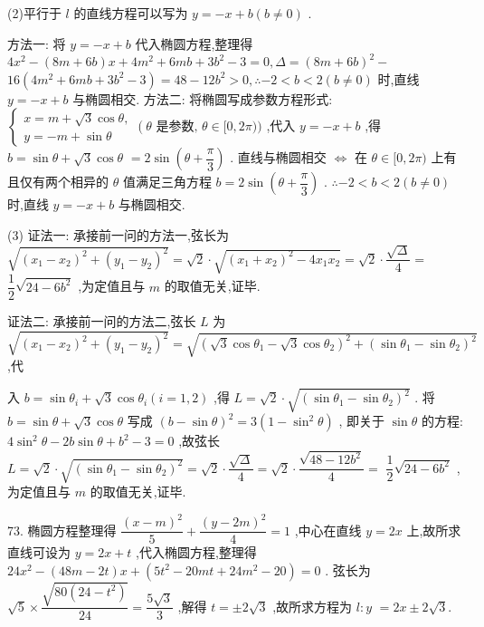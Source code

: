 (2)平行于 $l$ 的直线方程可以写为 $y =  - x + b\left( {b \neq  0}\right)$ .

方法一: 将 $y =  - x + b$ 代入椭圆方程,整理得 $4{x}^{2} - \left( {{8m} + {6b}}\right) x + 4{m}^{2} + {6mb} + 3{b}^{2} - 3 = 0,\Delta  = {\left( 8m + 6b\right) }^{2} -$  ${16}\left( {4{m}^{2} + {6mb} + 3{b}^{2} - 3}\right)  = {48} - {12}{b}^{2} > 0,\therefore  - 2 < b < 2\left( {b \neq  0}\right)$ 时,直线 $y =  - x + b$ 与椭圆相交. 方法二: 将椭圆写成参数方程形式: $\left\{  {\begin{array}{l} x = m + \sqrt{3}\cos \theta , \\  y =  - m + \sin \theta  \end{array}\left( {\theta \text{ 是参数, }\theta  \in  \lbrack 0,{2\pi }))}\right. }\right.$ ,代入 $y =  - x + b$ ,得 $b = \sin \theta  + \sqrt{3}\cos \theta$  $= 2\sin \left( {\theta  + \dfrac{\pi }{3}}\right)$ . 直线与椭圆相交 $\Leftrightarrow$ 在 $\theta  \in  \lbrack 0,{2\pi })$ 上有且仅有两个相异的 $\theta$ 值满足三角方程 $b = 2\sin \left( {\theta  + \dfrac{\pi }{3}}\right)$ . $\therefore  - 2 < b < 2\left( {b \neq  0}\right)$ 时,直线 $y =  - x + b$ 与椭圆相交.

(3) 证法一: 承接前一问的方法一,弦长为 $\sqrt{{\left( {x}_{1} - {x}_{2}\right) }^{2} + {\left( {y}_{1} - {y}_{2}\right) }^{2}} = \sqrt{2} \cdot  \sqrt{{\left( {x}_{1} + {x}_{2}\right) }^{2} - 4{x}_{1}{x}_{2}} = \sqrt{2} \cdot  \dfrac{\sqrt{\Delta }}{4} =$  $\dfrac{1}{2}\sqrt{{24} - 6{b}^{2}}$ ,为定值且与 $m$ 的取值无关,证毕.

证法二: 承接前一问的方法二,弦长 $L$ 为 $\sqrt{{\left( {x}_{1} - {x}_{2}\right) }^{2} + {\left( {y}_{1} - {y}_{2}\right) }^{2}} = \sqrt{{\left( \sqrt{3}\cos {\theta }_{1} - \sqrt{3}\cos {\theta }_{2}\right) }^{2} + {\left( \sin {\theta }_{1} - \sin {\theta }_{2}\right) }^{2}}$ ,代

入 $b = \sin {\theta }_{i} + \sqrt{3}\cos {\theta }_{i}\left( {i = 1,2}\right)$ ,得 $L = \sqrt{2} \cdot  \sqrt{{\left( \sin {\theta }_{1} - \sin {\theta }_{2}\right) }^{2}}$ . 将 $b = \sin \theta  + \sqrt{3}\cos \theta$ 写成 ${\left( b - \sin \theta \right) }^{2} = 3\left( {1 - {\sin }^{2}\theta }\right)$ , 即关于 $\sin \theta$ 的方程: $4{\sin }^{2}\theta  - {2b}\sin \theta  + {b}^{2} - 3 = 0$ ,故弦长 $L = \sqrt{2} \cdot  \sqrt{{\left( \sin {\theta }_{1} - \sin {\theta }_{2}\right) }^{2}} = \sqrt{2} \cdot  \dfrac{\sqrt{\Delta }}{4} = \sqrt{2} \cdot  \dfrac{\sqrt{{48} - {12}{b}^{2}}}{4} =$  $\dfrac{1}{2}\sqrt{{24} - 6{b}^{2}}$ ,为定值且与 $m$ 的取值无关,证毕.

73. 椭圆方程整理得 $\dfrac{{\left( x - m\right) }^{2}}{5} + \dfrac{{\left( y - 2m\right) }^{2}}{4} = 1$ ,中心在直线 $y = {2x}$ 上,故所求直线可设为 $y = {2x} + t$ ,代入椭圆方程,整理得 ${24}{x}^{2} - \left( {{48m} - {2t}}\right) x + \left( {5{t}^{2} - {20mt} + {24}{m}^{2} - {20}}\right)  = 0$ . 弦长为 $\sqrt{5} \times  \dfrac{\sqrt{{80}\left( {{24} - {t}^{2}}\right) }}{24} = \dfrac{5\sqrt{3}}{3}$ ,解得 $t =  \pm  2\sqrt{3}$ ,故所求方程为 $l : y$  $= {2x} \pm  2\sqrt{3}.$

